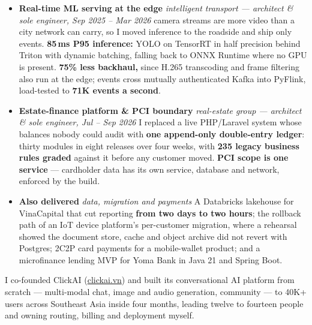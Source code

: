 \documentclass[10pt,a4paper,ragged2e,withhyper]{altacv}
\newcommand{\proj}[2]{\textbf{#1} \textcolor{accent}{\textbullet} \textit{#2}\newline}
\newcommand{\stack}[1]{\newline{\scriptsize\textcolor{emphasis}{#1}}}
\newcommand{\win}[1]{\textbf{\textcolor{emphasis}{#1}}}
\begin{document}
\begin{itemize}[itemsep=4pt,topsep=3pt,parsep=0pt]
  \item \proj{Real-time ML serving at the edge}{intelligent transport --- architect \& sole engineer, Sep 2025 -- Mar 2026}
  40 camera streams are more video than a city network can carry, so I moved inference to the roadside and ship only events. \win{85\,ms P95 inference:} YOLO on TensorRT in half precision behind Triton with dynamic batching, falling back to ONNX Runtime where no GPU is present. \win{75\% less backhaul,} since H.265 transcoding and frame filtering also run at the edge; events cross mutually authenticated Kafka into PyFlink, load-tested to \win{71K events a second}.
  \stack{Python · FastAPI · YOLO · TensorRT · Triton · ONNX Runtime · Kafka · PyFlink · K3s · ArgoCD · DuckDB}

  \item \proj{Estate-finance platform \& PCI boundary}{real-estate group --- architect \& sole engineer, Jul -- Sep 2026}
  I replaced a live PHP/Laravel system whose balances nobody could audit with \win{one append-only double-entry ledger}: thirty modules in eight releases over four weeks, with \win{235 legacy business rules graded} against it before any customer moved. \win{PCI scope is one service} --- cardholder data has its own service, database and network, enforced by the build.
  \stack{Python 3.12 · FastAPI · async SQLAlchemy 2 · PostgreSQL (schema per tenant) · Redis · 2C2P · AWS ECS · Envoy}

  \item \proj{Also delivered}{data, migration and payments}
  A Databricks lakehouse for VinaCapital that cut reporting \win{from two days to two hours}; the rollback path of an IoT device platform's per-customer migration, where a rehearsal showed the document store, cache and object archive did not revert with Postgres; 2C2P card payments for a mobile-wallet product; and a microfinance lending MVP for Yoma Bank in Java 21 and Spring Boot.
\end{itemize}

\divider


\begin{minipage}{\linewidth}
\justifying
I co-founded ClickAI (\href{https://clickai.vn}{clickai.vn}) and built its conversational AI platform from scratch --- multi-modal chat, image and audio generation, community --- to 40K+ users across Southeast Asia inside four months, leading twelve to fourteen people and owning routing, billing and deployment myself.
\end{minipage}
\end{document}
